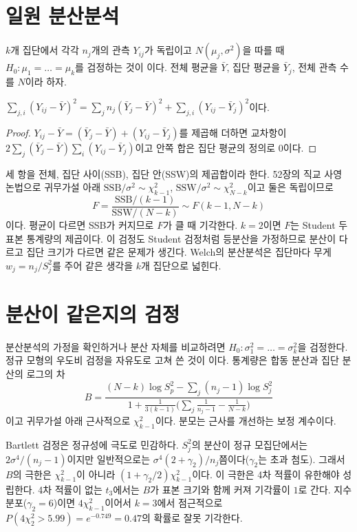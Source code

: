 \section{일원 분산분석}
\label{sec:anova}

$k$개 집단에서 각각 $n_j$개의 관측 $Y_{ij}$가 독립이고 $N(\mu_j,\sigma^2)$을 따를 때 $H_0:\mu_1=\dots=\mu_k$를 검정하는 것이 이다. 전체 평균을 $\bar Y$, 집단 평균을 $\bar Y_j$, 전체 관측 수를 $N$이라 하자.

\begin{proposition}
\label{prop:anova-decomposition}
$\sum_{j,i}(Y_{ij}-\bar Y)^2=\sum_jn_j(\bar Y_j-\bar Y)^2+\sum_{j,i}(Y_{ij}-\bar Y_j)^2$이다.
\end{proposition}

\begin{proof}
$Y_{ij}-\bar Y=(\bar Y_j-\bar Y)+(Y_{ij}-\bar Y_j)$를 제곱해 더하면 교차항이 $2\sum_j(\bar Y_j-\bar Y)\sum_i(Y_{ij}-\bar Y_j)$이고 안쪽 합은 집단 평균의 정의로 $0$이다.
\end{proof}

세 항을 전체, 집단 사이(SSB), 집단 안(SSW)의 제곱합이라 한다. 52장의 직교 사영 논법으로 귀무가설 아래 $\mathrm{SSB}/\sigma^2\sim\chi^2_{k-1}$, $\mathrm{SSW}/\sigma^2\sim\chi^2_{N-k}$이고 둘은 독립이므로
\[
F=\frac{\mathrm{SSB}/(k-1)}{\mathrm{SSW}/(N-k)}\sim F(k-1,N-k)
\]
이다. 평균이 다르면 SSB가 커지므로 $F$가 클 때 기각한다. $k=2$이면 $F$는 Student 두 표본 통계량의 제곱이다. 이 검정도 Student 검정처럼 등분산을 가정하므로 분산이 다르고 집단 크기가 다르면 같은 문제가 생긴다. Welch의 분산분석은 집단마다 무게 $w_j=n_j/S_j^2$를 주어 같은 생각을 $k$개 집단으로 넓힌다\cite{welch1951}.

\section{분산이 같은지의 검정}
\label{sec:variance-homogeneity}

분산분석의 가정을 확인하거나 분산 자체를 비교하려면 $H_0:\sigma_1^2=\dots=\sigma_k^2$을 검정한다. 정규 모형의 우도비 검정을 자유도로 고쳐 쓴 것이 이다\cite{bartlett1937}. 통계량은 합동 분산과 집단 분산의 로그의 차
\[
B=\frac{(N-k)\log S_p^2-\sum_j(n_j-1)\log S_j^2}{1+\frac1{3(k-1)}\bigl(\sum_j\frac1{n_j-1}-\frac1{N-k}\bigr)}
\]
이고 귀무가설 아래 근사적으로 $\chi^2_{k-1}$이다. 분모는 근사를 개선하는 보정 계수이다.

Bartlett 검정은 정규성에 극도로 민감하다. $S_j^2$의 분산이 정규 모집단에서는 $2\sigma^4/(n_j-1)$이지만 일반적으로는 $\sigma^4(2+\gamma_2)/n_j$쯤이다($\gamma_2$는 초과 첨도). 그래서 $B$의 극한은 $\chi^2_{k-1}$이 아니라 $(1+\gamma_2/2)\chi^2_{k-1}$이다. 이 극한은 4차 적률이 유한해야 성립한다. 4차 적률이 없는 $t_3$에서는 $B$가 표본 크기와 함께 커져 기각률이 $1$로 간다. 지수 분포($\gamma_2=6$)이면 $4\chi^2_{k-1}$이어서 $k=3$에서 점근적으로 $P(4\chi^2_2>5.99)=e^{-0.749}=0.47$의 확률로 잘못 기각한다.

